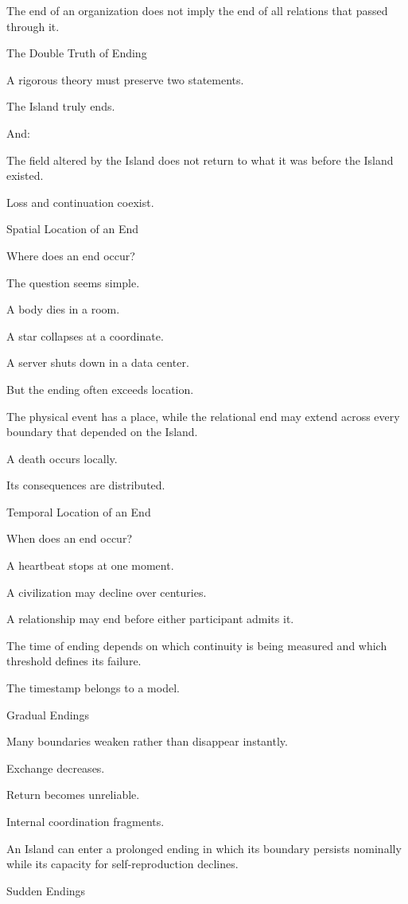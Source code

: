 The end of an organization does not imply the end of all relations that passed through it.

The Double Truth of Ending

A rigorous theory must preserve two statements.

The Island truly ends.

And:

The field altered by the Island does not return to what it was before the Island existed.

Loss and continuation coexist.

Spatial Location of an End

Where does an end occur?

The question seems simple.

A body dies in a room.

A star collapses at a coordinate.

A server shuts down in a data center.

But the ending often exceeds location.

The physical event has a place, while the relational end may extend across every boundary that depended on the Island.

A death occurs locally.

Its consequences are distributed.

Temporal Location of an End

When does an end occur?

A heartbeat stops at one moment.

A civilization may decline over centuries.

A relationship may end before either participant admits it.

The time of ending depends on which continuity is being measured and which threshold defines its failure.

The timestamp belongs to a model.

Gradual Endings

Many boundaries weaken rather than disappear instantly.

Exchange decreases.

Return becomes unreliable.

Internal coordination fragments.

An Island can enter a prolonged ending in which its boundary persists nominally while its capacity for self-reproduction declines.

Sudden Endings

